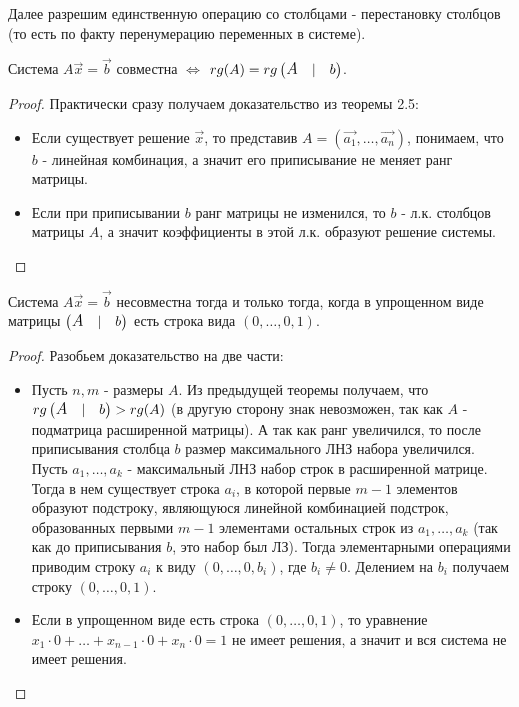 Далее разрешим единственную операцию со столбцами - перестановку столбцов (то есть по факту перенумерацию переменных в системе).
\begin{theorem}
\label{Теорема Кронекера-Капелли.}
    Система $A\vec{x}=\vec{b}$ совместна $\Leftrightarrow$ $rg(A)=rg\left( \begin{matrix} \text{\large \textit{A}} & |& b \end{matrix} \right)$.
\end{theorem}
\begin{proof}
    Практически сразу получаем доказательство из теоремы 2.5: 
    \begin{itemize}
        \item[$\Rightarrow$] Если существует решение $\vec{x}$, то представив $A=(\vec{a_1}, \dots, \vec{a_n})$, понимаем, что $b$ - линейная комбинация, а значит его приписывание не меняет ранг матрицы.
        \item[$\Leftarrow$] Если при приписывании $b$ ранг матрицы не изменился, то $b$ - л.к. столбцов матрицы $A$, а значит коэффициенты в этой л.к. образуют решение системы.
    \end{itemize}
\end{proof}
\begin{proposition}
    Система $A\vec{x}=\vec{b}$ несовместна тогда и только тогда, когда в упрощенном виде матрицы $\left( \begin{matrix} \text{\large \textit{A}} & |& b \end{matrix} \right)$ есть строка вида $(0, \dots, 0, 1)$.
\end{proposition}
\begin{proof}
    Разобьем доказательство на две части:
    \begin{itemize}
        \item[$\Rightarrow$] Пусть $n, m$ - размеры $A$. Из предыдущей теоремы получаем, что $rg \left( \begin{matrix} \text{\large \textit{A}} & |& b \end{matrix} \right) > rg(A)$ (в другую сторону знак невозможен, так как $A$ - подматрица расширенной матрицы). А так как ранг увеличился, то после приписывания столбца $b$ размер максимального ЛНЗ набора увеличился. Пусть $a_1, \dots, a_k$ - максимальный ЛНЗ набор строк в расширенной матрице. Тогда в нем существует строка $a_i$, в которой первые $m-1$ элементов образуют подстроку, являющуюся линейной комбинацией подстрок, образованных первыми $m-1$ элементами остальных строк из  $a_1, \dots, a_k$ (так как до приписывания $b$, это набор был ЛЗ). Тогда элементарными операциями приводим строку $a_i$ к виду $(0, \dots, 0, b_i)$, где $b_i \neq 0$. Делением на $b_i$ получаем строку $(0, \dots, 0,1)$.
        \item [$\Leftarrow$] Если в упрощенном виде есть строка $(0, \dots, 0, 1)$, то уравнение $x_1 \cdot 0 + \dots + x_{n-1} \cdot 0+ x_n \cdot 0 = 1$ не имеет решения, а значит и вся система не имеет решения.
    \end{itemize}
\end{proof}
